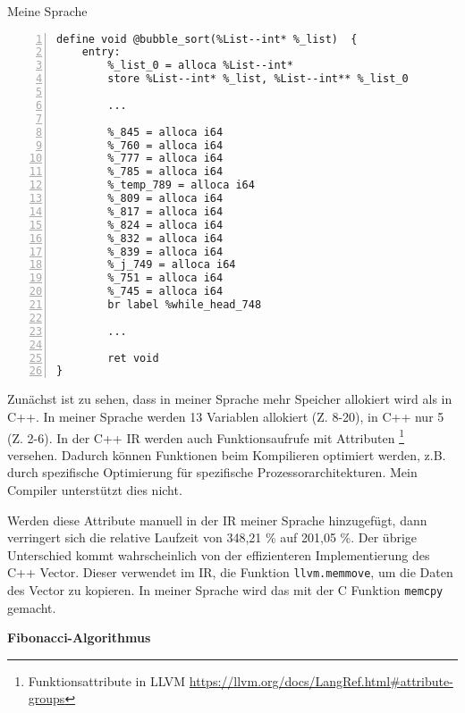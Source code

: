         \begin{center}
            Meine Sprache
        \end{center}

        \begin{lstlisting}[basicstyle=\tiny, numbers=left]
    define void @bubble_sort(%List--int* %_list)  {
    entry:
        %_list_0 = alloca %List--int*
        store %List--int* %_list, %List--int** %_list_0

        ...

        %_845 = alloca i64
        %_760 = alloca i64
        %_777 = alloca i64
        %_785 = alloca i64
        %_temp_789 = alloca i64
        %_809 = alloca i64
        %_817 = alloca i64
        %_824 = alloca i64
        %_832 = alloca i64
        %_839 = alloca i64
        %_j_749 = alloca i64
        %_751 = alloca i64
        %_745 = alloca i64
        br label %while_head_748
            
        ...

        ret void
}

        \end{lstlisting}

    Zunächst ist zu sehen, dass in meiner Sprache mehr Speicher allokiert wird als in C++.
    In meiner Sprache werden 13 Variablen allokiert (Z. 8-20), in C++ nur 5 (Z. 2-6).
    In der C++ IR werden auch Funktionsaufrufe mit Attributen 
    \footnote{Funktionsattribute in LLVM \url{https://llvm.org/docs/LangRef.html\#attribute-groups}}
    versehen. Dadurch können Funktionen beim Kompilieren optimiert werden, z.B. durch spezifische Optimierung für spezifische Prozessorarchitekturen.
    Mein Compiler unterstützt dies nicht.

    Werden diese Attribute manuell in der IR meiner Sprache hinzugefügt, dann verringert sich die relative Laufzeit von 348,21 \% auf 201,05 \%.
    Der übrige Unterschied kommt wahrscheinlich von der effizienteren  Implementierung des C++ Vector.
    Dieser verwendet im IR, die Funktion \texttt{llvm.memmove}, um die Daten des Vector zu kopieren.
    In meiner Sprache wird das mit der C Funktion \texttt{memcpy} gemacht.

    \newpage

    \begin{center}
        \textbf{Fibonacci-Algorithmus}
    \end{center}



